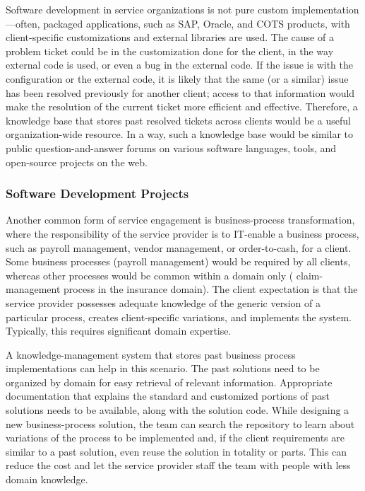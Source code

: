 Software development in service organizations is not pure custom
implementation---often, packaged applications, such as SAP, Oracle, and COTS
products, with client-specific customizations and external libraries are
used. The cause of a problem ticket could be in the customization done for the
client, in the way external code is used, or even a bug in the external code. If
the issue is with the configuration or the external code, it is likely that the
same (or a similar) issue has been resolved previously for another client;
access to that information would make the resolution of the current ticket more
efficient and effective.  Therefore, a knowledge base that stores past resolved
tickets across clients would be a useful organization-wide resource.  In a way,
such a knowledge base would be similar to public question-and-answer forums on
various software languages, tools, and open-source projects on the web.

\subsubsection{Software Development Projects}

Another common form of service engagement is business-process transformation,
where the responsibility of the service provider is to IT-enable a business
process, such as payroll management, vendor management, or order-to-cash, for a
client. Some business processes (\eg payroll management) would be required by
all clients, whereas other processes would be common within a domain only (\eg
claim-management process in the insurance domain).  The client expectation is
that the service provider possesses adequate knowledge of the generic version of
a particular process, creates client-specific variations, and implements the
system. Typically, this requires significant domain expertise.

A knowledge-management system that stores past business process implementations
can help in this scenario. The past solutions need to be organized by domain for
easy retrieval of relevant information. Appropriate documentation that explains
the standard and customized portions of past solutions needs to be available,
along with the solution code. While designing a new business-process solution,
the team can search the repository to learn about variations of the process to
be implemented and, if the client requirements are similar to a past solution,
even reuse the solution in totality or parts. This can reduce the cost and let
the service provider staff the team with people with less domain knowledge.

